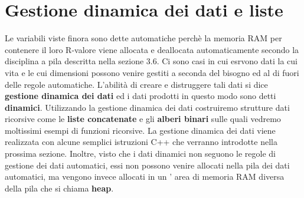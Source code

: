 \chapter{Gestione dinamica dei dati e liste}

Le variabili viste finora sono dette automatiche perchè la memoria RAM per contenere il loro R-valore viene allocata e deallocata automaticamente secondo la disciplina a pila descritta nella sezione 3.6. Ci sono casi in cui esrvono dati la cui vita e le cui dimensioni possono venire gestiti a seconda del bisogno ed al di fuori delle regole automatiche. L'abilità di creare e distruggere tali dati si dice \textbf{gestione dinamica dei dati} ed i dati prodotti in questo modo sono detti \textbf{dinamici}. Utilizzando la gestione dinamica dei dati costruiremo strutture dati ricorsive come le \textbf{liste concatenate} e gli \textbf{alberi binari} sulle quali vedremo moltissimi esempi di funzioni ricorsive. La gestione dinamica dei dati viene realizzata con alcune semplici istruzioni C++ che verranno introdotte nella prossima sezione. Inoltre, visto che i dati dinamici non seguono le regole di gestione dei dati automatici, essi non possono venire allocati nella pila dei dati automatici, ma vengono invece allocati in un ' area di memoria RAM diversa della pila che si chiama \textbf{heap}.

